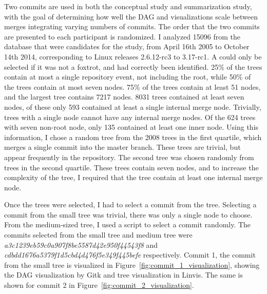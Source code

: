 Two commits are used in both the conceptual study and summarization
study, with the goal of determining how well the DAG and \mt{}
visualizations scale between merges integrating varying numbers of
commits. The order that the two commits are presented to each
participant is randomized. I analyzed 15096  from the
database that were candidates for the study, from April 16th 2005 to
October 14th 2014, corresponding to Linux releases 2.6.12-rc3 to
3.17-rc1. A \mt{} could only be selected if it was not a foxtrot,
and had correctly been identified. 25\% of the trees contain at most a
single repository event, not including the root, while 50\% of the trees
contain at most seven nodes. 75\% of the trees contain at least 51
nodes, and the largest tree contains 7217 nodes. 8031 trees contained at
least seven nodes, of these only 593 contained at least a single
internal merge node. Trivially, trees with a single node cannot have any
internal merge nodes. Of the 624 trees with seven non-root node, only
135 contained at least one inner node. Using this information, I chose a
random tree from the 2008 trees in the first quartile, which merges a
single commit into the master branch. These trees are trivial, but
appear frequently in the repository. The second tree was chosen randomly
from trees in the second quartile. These trees contain seven nodes, and
to increase the complexity of the tree, I required that the tree contain
at least one internal merge node.

Once the trees were selected, I had to select a commit from the tree.
Selecting a commit from the small tree was trivial, there was only a
single node to choose. From the medium-sized tree, I used a script to
select a commit randomly. The commits selected from the small tree and
medium tree were \emph{a3c1239eb59c0a907f8be5587d42e950f44543f8} and
\emph{cdbdd1676a5379f1d5cbd4d476f5e349f445befe} respectively. Commit 1,
the commit from the small tree is visualized in
Figure~\ref{fig:commit_1_visualization}, showing the DAG visualization
by Gitk and \rt{} tree visualization in Linvis. The same is
shown for commit 2 in Figure~\ref{fig:commit_2_visualization}.


